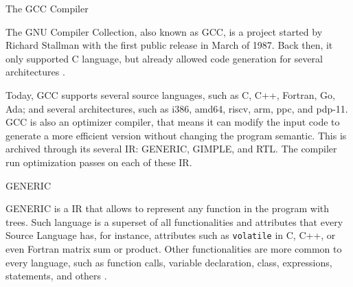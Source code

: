 \begin{section}{The GCC Compiler}\label{sec:gcc_compiler}

The GNU Compiler Collection, also known as GCC, is a project started by
Richard Stallman with the first public release in March of 1987. Back then,
it only supported C language, but already allowed code generation for
several architectures \citep{gcc_first_ver}.

Today, GCC supports several source languages, such as C, C++, Fortran, Go, Ada;
and several architectures, such as i386, amd64, riscv, arm, ppc, and pdp-11. GCC
is also an optimizer compiler, that means it can modify the input code to generate
a more efficient version without changing the program semantic. This is archived
through its several IR: GENERIC, GIMPLE,
and RTL. The compiler run optimization passes on each of these IR.


\begin{subsection}{GENERIC}

	GENERIC is a IR that allows to represent any function in the program with trees.
Such language is a superset of all functionalities and attributes that every Source
Language has, for instance, attributes such as \texttt{volatile} in C, C++, or even
Fortran matrix sum or product. Other functionalities are more common to every language,
such as function calls, variable declaration, class, expressions, statements, and
others \citep{generic}.



\end{subsection}
\end{section}
